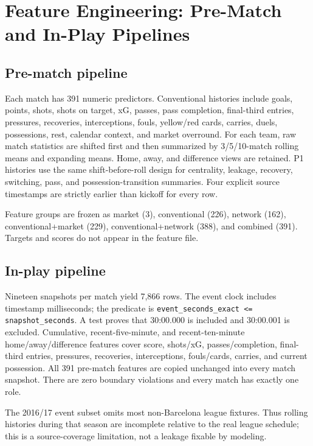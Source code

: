 \documentclass[10pt]{article}
\begin{document}
\section{Feature Engineering: Pre-Match and In-Play Pipelines}

\subsection*{Pre-match pipeline}

Each match has 391 numeric predictors. Conventional histories include goals, points, shots, shots on target, xG, passes, pass completion, final-third entries, pressures, recoveries, interceptions, fouls, yellow/red cards, carries, duels, possessions, rest, calendar context, and market overround. For each team, raw match statistics are shifted first and then summarized by 3/5/10-match rolling means and expanding means. Home, away, and difference views are retained. P1 histories use the same shift-before-roll design for centrality, leakage, recovery, switching, pass, and possession-transition summaries. Four explicit source timestamps are strictly earlier than kickoff for every row.

Feature groups are frozen as market (3), conventional (226), network (162), conventional+market (229), conventional+network (388), and combined (391). Targets and scores do not appear in the feature file.

\subsection*{In-play pipeline}

Nineteen snapshots per match yield 7,866 rows. The event clock includes timestamp milliseconds; the predicate is \texttt{event\_seconds\_exact <= snapshot\_seconds}. A test proves that 30:00.000 is included and 30:00.001 is excluded. Cumulative, recent-five-minute, and recent-ten-minute home/away/difference features cover score, shots/xG, passes/completion, final-third entries, pressures, recoveries, interceptions, fouls/cards, carries, and current possession. All 391 pre-match features are copied unchanged into every match snapshot. There are zero boundary violations and every match has exactly one role.

The 2016/17 event subset omits most non-Barcelona league fixtures. Thus rolling histories during that season are incomplete relative to the real league schedule; this is a source-coverage limitation, not a leakage fixable by modeling.
\end{document}

